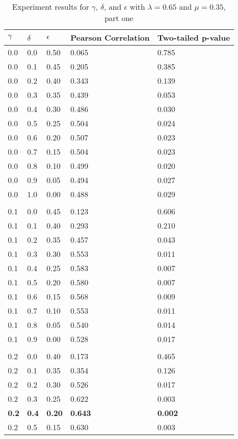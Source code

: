 \documentclass{article}
\begin{document}
\begin{table}[h!]
\caption{Experiment results for $\gamma$, $\delta$, and $\epsilon$ with $\lambda = 0.65$ and $\mu = 0.35$, part one}
\centering
\begin{tabular}{lllll}
	\toprule
	$\gamma$ & $\delta$ & $\epsilon$ & Pearson Correlation & Two-tailed p-value \\
\midrule
	0.0 & 0.0 & 0.50 & 0.065 & 0.785 \\
	0.0 & 0.1 & 0.45 & 0.205 & 0.385 \\
	0.0 & 0.2 & 0.40 & 0.343 & 0.139 \\
	0.0 & 0.3 & 0.35 & 0.439 & 0.053 \\
	0.0 & 0.4 & 0.30 & 0.486 & 0.030 \\ 
	0.0 & 0.5 & 0.25 & 0.504 & 0.024 \\
	0.0 & 0.6 & 0.20 & 0.507 & 0.023 \\
	0.0 & 0.7 & 0.15 & 0.504 & 0.023 \\
	0.0 & 0.8 & 0.10 & 0.499 & 0.020 \\
	0.0 & 0.9 & 0.05 & 0.494 & 0.027 \\
	0.0 & 1.0 & 0.00 & 0.488 & 0.029 \\
	&&&& \\
	0.1 & 0.0 & 0.45 & 0.123 & 0.606 \\
	0.1 & 0.1 & 0.40 & 0.293 & 0.210 \\
	0.1 & 0.2 & 0.35 & 0.457 & 0.043 \\
	0.1 & 0.3 & 0.30 & 0.553 & 0.011 \\
	0.1 & 0.4 & 0.25 & 0.583 & 0.007 \\
	0.1 & 0.5 & 0.20 & 0.580 & 0.007 \\
	0.1 & 0.6 & 0.15 & 0.568 & 0.009 \\
	0.1 & 0.7 & 0.10 & 0.553 & 0.011 \\
	0.1 & 0.8 & 0.05 & 0.540 & 0.014 \\
	0.1 & 0.9 & 0.00 & 0.528 & 0.017 \\
		&&&& \\
	0.2 & 0.0 & 0.40 & 0.173 & 0.465 \\
	0.2 & 0.1 & 0.35 & 0.354 & 0.126 \\
	0.2 & 0.2 & 0.30 & 0.526 & 0.017 \\
	0.2 & 0.3 & 0.25 & 0.622 & 0.003 \\
	\textbf{0.2} & \textbf{0.4} & \textbf{0.20} & \textbf{0.643} & \textbf{0.002} \\
	0.2 & 0.5 & 0.15 & 0.630 & 0.003 \\

\end{tabular}
\end{table}
\end{document}
